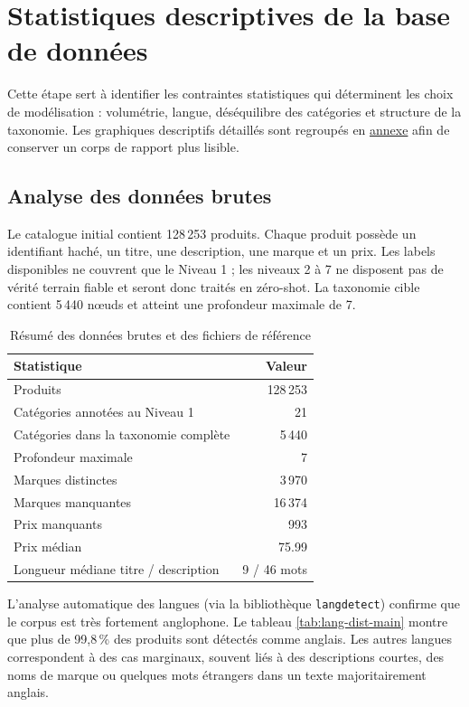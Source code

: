 \documentclass[12pt,a4paper]{report}
\begin{document}
\chapter{Statistiques descriptives de la base de données}
\label{chap:descriptive-statistics}

Cette étape sert à identifier les contraintes statistiques qui déterminent les choix de modélisation : volumétrie, langue, déséquilibre des catégories et structure de la taxonomie. Les graphiques descriptifs détaillés sont regroupés en \hyperref[sec:data-detailed-annex]{annexe} afin de conserver un corps de rapport plus lisible.

\section{Analyse des données brutes}

Le catalogue initial contient 128\,253 produits. Chaque produit possède un identifiant haché, un titre, une description, une marque et un prix. Les labels disponibles ne couvrent que le Niveau 1 ; les niveaux 2 à 7 ne disposent pas de vérité terrain fiable et seront donc traités en zéro-shot. La taxonomie cible contient 5\,440 nœuds et atteint une profondeur maximale de 7.

\begin{table}[H]
    \centering
    \caption{Résumé des données brutes et des fichiers de référence}
    \label{tab:raw-dataset-summary}
    \begin{tabular}{lr}
        \toprule
        \textbf{Statistique} & \textbf{Valeur} \\
        \midrule
        Produits & 128\,253 \\
        Catégories annotées au Niveau 1 & 21 \\
        Catégories dans la taxonomie complète & 5\,440 \\
        Profondeur maximale & 7 \\
        Marques distinctes & 3\,970 \\
        Marques manquantes & 16\,374 \\
        Prix manquants & 993 \\
        Prix médian & 75.99 \\
        Longueur médiane titre / description & 9 / 46 mots \\
        \bottomrule
    \end{tabular}
\end{table}

L'analyse automatique des langues (via la bibliothèque \texttt{langdetect}) confirme que le corpus est très fortement anglophone. Le tableau \ref{tab:lang-dist-main} montre que plus de 99{,}8\,\% des produits sont détectés comme anglais. Les autres langues correspondent à des cas marginaux, souvent liés à des descriptions courtes, des noms de marque ou quelques mots étrangers dans un texte majoritairement anglais.
\end{document}
